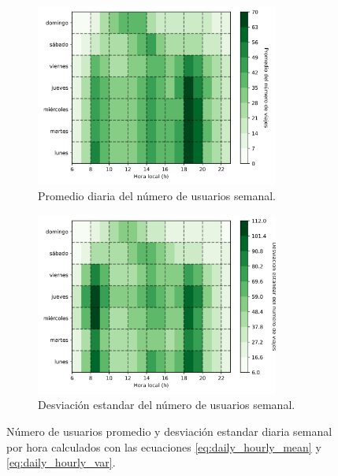 \begin{figure}[H]
    \centering
    \begin{subfigure}[b]{8cm}
        \includegraphics[width=8cm]{Graphics/daily_hourly_mean_count_travel.png}
        \caption{Promedio diaria del número de usuarios semanal.}
        \label{fig:daily_hourly_mean_count_travel}
    \end{subfigure}
    \begin{subfigure}[b]{8cm}
        \includegraphics[width=8cm]{Graphics/daily_hourly_var_count_travel.png}
        \caption{Desviación estandar del número de usuarios semanal.}
        \label{fig:daily_hourly_var_count_travel}
    \end{subfigure}
    \caption{Número de usuarios promedio y desviación estandar diaria semanal por hora calculados con las ecuaciones \ref{eq:daily_hourly_mean} y \ref{eq:daily_hourly_var}.}
    \label{fig:daily_hourly_count_travel}
\end{figure}